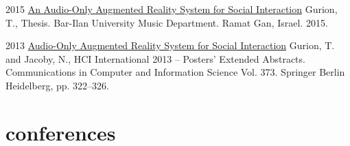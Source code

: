 \documentclass[]{friggeri-cv}  %
\begin{document}
\begin{entrylist}

    \entry
    {2015}
    {\href{http://www.tomgurion.me/pdfs/Gurion - An Audio-Only Augmented Reality System for Social Interaction.pdf}{An Audio-Only Augmented Reality System for Social Interaction}}
    {}
    {Gurion, T., Thesis. Bar-Ilan University Music Department. Ramat Gan, Israel. 2015.}

\end{entrylist}

\begin{entrylist}

    \entry
    {2013}
    {\href{http://www.tomgurion.me/pdfs/Gurion and Jacoby - Audio-Only Augmented Reality System for Social Interaction.pdf}{Audio-Only Augmented Reality System for Social Interaction}}
    {}
    {Gurion, T. and Jacoby, N., HCI International 2013 -- Posters’ Extended Abstracts. Communications in Computer and Information Science Vol. 373. Springer Berlin Heidelberg, pp. 322–326.}

\end{entrylist}


\section{conferences}
\end{document}
